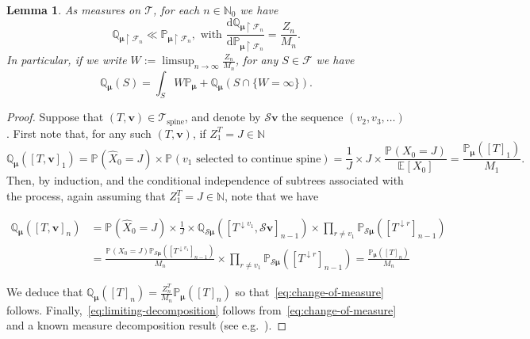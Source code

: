 \documentclass[12pt]{article}
\newtheorem{lem}[thm]{Lemma}
\theoremstyle{definition}
\newcommand{\E}[2][]{\ensuremath{\mathbb{E}_{#1}\left[#2 \right]}}
\newcommand{\Prob}[2][]{\ensuremath{\mathbb{P}_{#1} \left(#2 \right)}}
\newcommand{\dd}{\mathrm{d}}
\newcommand{\Probtwo}[2][]{\ensuremath{\mathbb{Q}_{#1} \left(#2 \right)}}
\DeclareMathOperator{\spine}{spine}
\begin{document}
\begin{lem} \label{lem:change-of-measure}
    As measures on $\mathscr{T}$, for each $n \in \mathbb{N}_0$ we have 
\begin{equation} \label{eq:change-of-measure}
\mathbb{Q}_{\boldsymbol{\mu} \restriction \mathcal{F}_n} \ll \mathbb{P}_{\boldsymbol{\mu} \restriction \mathcal{F}_n}, \text{ with } \frac{\dd \mathbb{Q}_{\boldsymbol{\mu} \restriction \mathcal{F}_n}}{\dd \mathbb{P}_{\boldsymbol{\mu} \restriction \mathcal{F}_n}} = \frac{Z_{n}}{M_n}.
\end{equation}
In particular, if we write $W :=  \limsup_{n \to \infty} \frac{Z_{n}}{M_n}$, for any $S \in \mathscr{F}$ we have  
\begin{equation} \label{eq:limiting-decomposition}
\mathbb{Q}_{\boldsymbol{\mu}}(S) = \int_{S} W \mathbb{P}_{\boldsymbol{\mu}} + \mathbb{Q}_{\boldsymbol{\mu}}\left(S \cap \{W = \infty\}\right). 
\end{equation}
\end{lem}
\begin{proof}
Suppose that $(T, \boldsymbol{v}) \in \mathscr{T}_{\spine}$, and denote by $\mathcal{S}\boldsymbol{v}$ the sequence $(v_2, v_3, \ldots)$. First note that, for any such $(T, \boldsymbol{v})$, if $Z^{T}_{1} = J \in \mathbb{N}$
\[
\Probtwo[\boldsymbol{\mu}]{[T, \boldsymbol{v}]_1} = \Prob{\widehat{X}_0 = J} \times \Prob{v_1 \text{ selected to continue spine}} = \frac{1}{J} \times J \times\frac{\Prob{X_0 = J}}{\E{X_0}} = \frac{\Prob[\boldsymbol{\mu}]{[T]_1}}{M_1}.
\]
Then, by induction, and the conditional independence of subtrees associated with the process, again assuming that $Z^{T}_{1} = J \in \mathbb{N}$, note that we have
\begin{linenomath}
\begin{align}
\nonumber \Probtwo[\boldsymbol{\mu}]{[T, \boldsymbol{v}]_{n}} & = \Prob{\widehat{X}_{0} = J} \times \frac{1}{J} \times \Probtwo[\mathcal{S}\boldsymbol{\mu}]{[T^{\downarrow v_1}, \mathcal{S}\boldsymbol{v}]_{n-1}} \times \prod_{r \neq v_{1}} \Prob[\mathcal{S}\boldsymbol{\mu}]{[T^{\downarrow r}]_{n-1}} 
\\ & = \frac{\Prob{X_0 = J} \Prob[\mathcal{S}\boldsymbol{\mu}]{[T^{\downarrow v_1}]_{n-1}}}{M_n} \times \prod_{r \neq v_{1}} \Prob[\mathcal{S}\boldsymbol{\mu}]{[T^{\downarrow r}]_{n-1}} = \frac{\Prob[\boldsymbol{\mu}]{[T]_{n}}}{M_n}
\end{align}
\end{linenomath}
We deduce that $\Probtwo[\boldsymbol{\mu}]{[T]_n} = \frac{Z^{T}_{n}}{M_n} \Prob[\boldsymbol{\mu}]{[T]_n}$ 
so that~\eqref{eq:change-of-measure} follows. Finally,~\eqref{eq:limiting-decomposition} follows from~\eqref{eq:change-of-measure} and a known measure decomposition result (see e.g.~\cite[Equation~(12.4)]{lyons}).
\end{proof}
\end{document}
